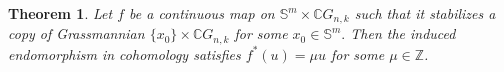 \documentclass{amsart}
\newtheorem{theorem}{Theorem}[section]
\begin{document}
	
	
	\begin{theorem}\label{ind from top}
		Let $f$ be a continuous map on $\mathbb S^m\times \mathbb CG_{n,k}$ such that it stabilizes a copy of Grassmannian $\{{x_0}\}\times \mathbb CG_{n,k}$ for some $x_0\in \mathbb S^m.$ Then the induced endomorphism in cohomology satisfies $f^*(u) = \mu u$ for some $\mu \in \mathbb Z$.
	\end{theorem}
	
	
	
\end{document}
